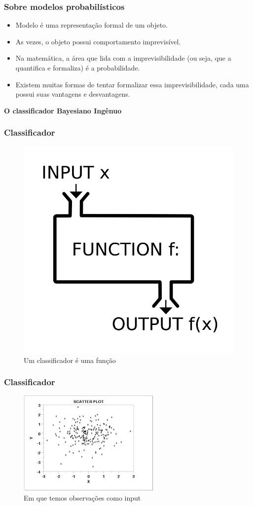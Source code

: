 \documentclass[xcolor=table]{beamer}
\begin{document}
	\begin{frame}
		\frametitle{Sobre modelos probabilísticos}
		\begin{itemize}
			\item Modelo é uma representação formal de um objeto.\\
			\item As vezes, o objeto possui comportamento imprevisível.\\
			\item Na matemática, a área que lida com a imprevisibilidade (ou seja, que a quantifica e formaliza) é a probabilidade.\\
			\item Existem muitas formas de tentar formalizar essa imprevisibilidade, cada uma possui suas vantagens e desvantagens.\\
		\end{itemize}
	\end{frame}
	\begin{frame}
		\centering \textbf{O classificador Bayesiano Ingênuo\\}
	\end{frame}
	\begin{frame}
		\frametitle{Classificador}
		\begin{figure}
\centering
\includegraphics[width=0.5\linewidth,height=0.5\textheight]{funcao-esquema}
\caption{Um classificador é uma função}
\label{fig:funcao-esquema}
\end{figure}
	
	\end{frame}
	\begin{frame}
		\frametitle{Classificador}
		\begin{figure}
\centering
\includegraphics[width=0.7\linewidth]{classes-feio}
\caption{Em que temos observações como input}
\label{fig:classes-feio}
\end{figure}

	\end{frame}
\end{document}
